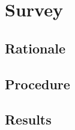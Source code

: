 
\chapter{Survey}
\label{cha:survey}

\section{Rationale}
\label{sec:surveyrationale}

\section{Procedure}
\label{sec:surveyprocedure}


\section{Results}

